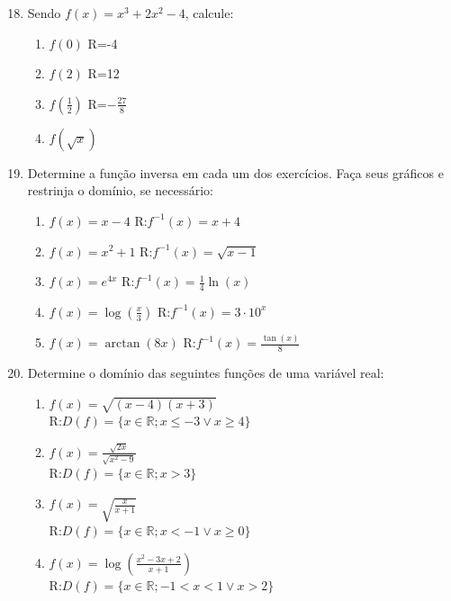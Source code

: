 \documentclass[oneside,a4paper,12pt]{article}
\begin{document}
\begin{enumerate}
	\setcounter{enumi}{17}

	\item Sendo $f(x) = x^{3} + 2x^2 - 4$, calcule:
	\begin{multicols}{2}
	\begin{enumerate}
		\item $f(0)$ R=-4
		\item $f(2)$ R=12
		\item $f(\frac{1}{2})$ R=$-\frac{27}{8}$
		\item $f(\sqrt{x})$
	\end{enumerate}
	\end{multicols}

	\item Determine a função inversa em cada um dos exercícios. Faça seus gráficos e restrinja o domínio, se necessário:
	\begin{multicols}{2}
	\begin{enumerate}
		\item $f(x) = x -4$ R:$f^{-1}(x) = x + 4$
		\item $f(x) = x^2 + 1$ R:$f^{-1}(x) = \sqrt{x-1}$
		\item $f(x) = e^{4x}$ R:$f^{-1}(x) = \frac{1}{4}\ln(x)$
		\item $f(x) = \log(\frac{x}{3})$ R:$f^{-1}(x)=3 \cdot 10^x$
		\item $f(x) = \arctan(8x)$ R:$f^{-1}(x) = \frac{\tan(x)}{8}$
	\end{enumerate}
	\end{multicols}

	\item Determine o domínio das seguintes funções de uma variável real:
	\begin{multicols}{2}
	\begin{enumerate}
		\item $f(x) = \sqrt{(x-4)(x+3)}$ \\ R:$D(f)=\{x \in \mathbb{R}; x \leq -3 \lor x \geq 4 \}$
		\item $f(x) = \frac{\sqrt{2x}}{\sqrt{x^2 - 9}}$ \\ R:$D(f)=\{x \in \mathbb{R}; x > 3\}$
		\item $f(x) = \sqrt{\frac{x}{x+1}}$ \\ R:$D(f)=\{x \in \mathbb{R}; x < -1 \lor x \geq 0 \}$
		\item $f(x) = \log(\frac{x^{2}-3x+2}{x+1})$ \\ R:$D(f)=\{x \in \mathbb{R}; -1 < x < 1 \lor x>2 \}$
	\end{enumerate}
	\end{multicols}


\end{enumerate}
\end{document}
